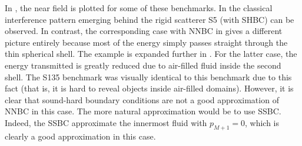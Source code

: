 In , the near field is plotted for some of these benchmarks. In  the classical interference pattern emerging behind the rigid scatterer S5 (with SHBC) can be observed. In contrast, the corresponding case with NNBC in  gives a different picture entirely because most of the energy simply passes straight through the thin spherical shell. The example is expanded further in . For the latter case, the energy transmitted is greatly reduced due to air-filled fluid inside the second shell. The S135 benchmark was visually identical to this benchmark due to this fact (that is, it is hard to reveal objects inside air-filled domains). However, it is clear that sound-hard boundary conditions are not a good approximation of NNBC in this case. The more natural approximation would be to use SSBC. Indeed, the SSBC approximate the innermost fluid with $p_{M+1}=0$, which is clearly a good approximation in this case.
